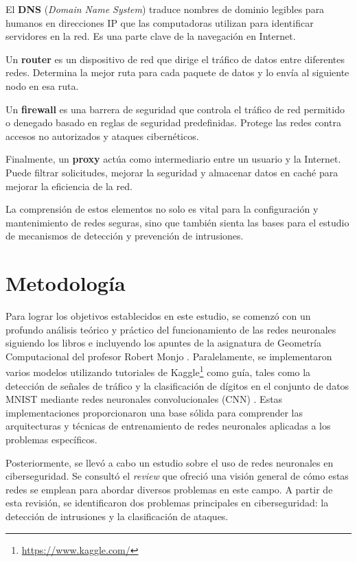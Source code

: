 El \textbf{DNS} (\textit{Domain Name System}) traduce nombres de dominio legibles para humanos en direcciones IP que las computadoras utilizan para identificar servidores en la red. Es una parte clave de la navegación en Internet.

Un \textbf{router} es un dispositivo de red que dirige el tráfico de datos entre diferentes redes. Determina la mejor ruta para cada paquete de datos y lo envía al siguiente nodo en esa ruta.

Un \textbf{firewall} es una barrera de seguridad que controla el tráfico de red permitido o denegado basado en reglas de seguridad predefinidas. Protege las redes contra accesos no autorizados y ataques cibernéticos.

Finalmente, un \textbf{proxy} actúa como intermediario entre un usuario y la Internet. Puede filtrar solicitudes, mejorar la seguridad y almacenar datos en caché para mejorar la eficiencia de la red.

La comprensión de estos elementos no solo es vital para la configuración y mantenimiento de redes seguras, sino que también sienta las bases para el estudio de mecanismos de detección y prevención de intrusiones.


\newpage


\section{Metodología} \label{Subsubsec: 1_3}

Para lograr los objetivos establecidos en este estudio, se comenzó con un profundo análisis teórico y práctico del funcionamiento de las redes neuronales siguiendo los libros \citep{geron2022hands, pajares2021aprendizaje} e incluyendo los apuntes de la asignatura de Geometría Computacional del profesor Robert Monjo \citep{monjogcom}. Paralelamente, se implementaron varios modelos utilizando tutoriales de Kaggle\footnote{\url{https://www.kaggle.com/}} como guía, tales como la detección de señales de tráfico y la clasificación de dígitos en el conjunto de datos MNIST mediante redes neuronales convolucionales (CNN) \citep{conceptos_RN_DesdeCero2, kaggle_cnn_tutorial}. Estas implementaciones proporcionaron una base sólida para comprender las arquitecturas y técnicas de entrenamiento de redes neuronales aplicadas a los problemas específicos.

Posteriormente, se llevó a cabo un estudio sobre el uso de redes neuronales en ciberseguridad. Se consultó el \textit{review} \citep{podder2021artificial} que ofreció una visión general de cómo estas redes se emplean para abordar diversos problemas en este campo. A partir de esta revisión, se identificaron dos problemas principales en ciberseguridad: la detección de intrusiones y la clasificación de ataques.

